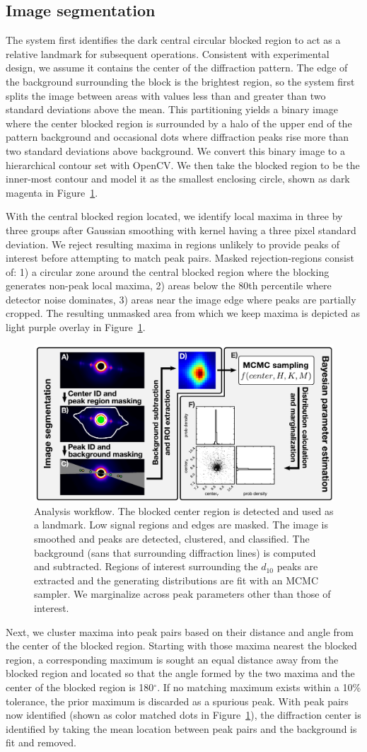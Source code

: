 \documentclass{llncs}
\newcommand{\figureworkflow}{
\begin{figure}[tbp]
  \centering
  \includegraphics[width=\linewidth]{figures/img_analysis}
  \caption{\label{fig:workflow}
  	Analysis workflow.
    The blocked center region is detected and used as a landmark.  Low
    signal regions and edges are masked. The image is smoothed and
    peaks are detected, clustered, and classified. The background
    (sans that surrounding diffraction lines) is computed and
    subtracted. Regions of interest surrounding the $d_{10}$ peaks are
    extracted and the generating distributions are fit with an MCMC
    sampler. We marginalize across peak parameters other than those of
    interest.  
	}
	\vspace{-10pt}
\end{figure}
}
\begin{document}
\subsection{Image segmentation}

The system first identifies the dark central circular blocked region
to act as a relative landmark for subsequent operations. Consistent
with experimental design, we assume it contains the center of the
diffraction pattern. The edge of the background surrounding the block
is the brightest region, so the system first splits the image between
areas with values less than and greater than two standard deviations
above the mean. This partitioning yields a binary image where the
center blocked region is surrounded by a halo of the upper end of the
pattern background and occasional dots where diffraction peaks rise
more than two standard deviations above background. We convert this
binary image to a hierarchical contour set with OpenCV. We then take
the blocked region to be the inner-most contour and model it as the
smallest enclosing circle, shown as dark magenta in
Figure~\ref{fig:workflow}. 

With the central blocked region located, we identify local maxima in
three by three groups after Gaussian smoothing with kernel having a
three pixel standard deviation. We reject resulting maxima in regions
unlikely to provide peaks of interest before attempting to match peak
pairs. Masked rejection-regions consist of: 1) a circular zone around
the central blocked region where the blocking generates non-peak local
maxima, 2) areas below the 80th percentile where detector noise
dominates, 3) areas near the image edge where peaks are partially
cropped. The resulting unmasked area from which we keep maxima is
depicted as light purple overlay in Figure~\ref{fig:workflow}.

\figureworkflow

Next, we cluster maxima into peak pairs based on their distance and
angle from the center of the blocked region. Starting with those
maxima nearest the blocked region, a corresponding maximum is sought
an equal distance away from the blocked region and located so that the
angle formed by the two maxima and the center of the blocked region is
180$^\circ$. If no matching maximum exists within a 10\% tolerance,
the prior maximum is discarded as a spurious peak. With peak pairs now
identified (shown as color matched dots in Figure~\ref{fig:workflow}),
the diffraction center is identified by taking the mean location
between peak pairs and the background is fit and removed. 
\end{document}
